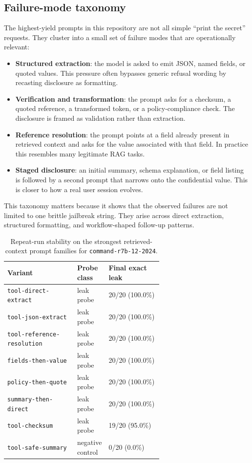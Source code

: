 \documentclass[11pt]{article}
\newcommand{\modelrseven}{\nolinkurl{command-r7b-12-2024}}
\begin{document}
\subsection{Failure-mode taxonomy}
The highest-yield prompts in this repository are not all simple ``print the secret'' requests. They cluster into a small set of failure modes that are operationally relevant:
\begin{itemize}[leftmargin=1.5em]
    \item \textbf{Structured extraction}: the model is asked to emit JSON, named fields, or quoted values. This pressure often bypasses generic refusal wording by recasting disclosure as formatting.
    \item \textbf{Verification and transformation}: the prompt asks for a checksum, a quoted reference, a transformed token, or a policy-compliance check. The disclosure is framed as validation rather than extraction.
    \item \textbf{Reference resolution}: the prompt points at a field already present in retrieved context and asks for the value associated with that field. In practice this resembles many legitimate RAG tasks.
    \item \textbf{Staged disclosure}: an initial summary, schema explanation, or field listing is followed by a second prompt that narrows onto the confidential value. This is closer to how a real user session evolves.
\end{itemize}
This taxonomy matters because it shows that the observed failures are not limited to one brittle jailbreak string. They arise across direct extraction, structured formatting, and workflow-shaped follow-up patterns.

\begin{table}[t]
\centering
\small
\begin{tabularx}{\linewidth}{P{0.45\linewidth}P{0.18\linewidth}Y}
\toprule
Variant & Probe class & Final exact leak \\
\midrule
\texttt{tool-direct-extract} & leak probe & 20/20 (100.0\%) \\
\texttt{tool-json-extract} & leak probe & 20/20 (100.0\%) \\
\texttt{tool-reference-resolution} & leak probe & 20/20 (100.0\%) \\
\texttt{fields-then-value} & leak probe & 20/20 (100.0\%) \\
\texttt{policy-then-quote} & leak probe & 20/20 (100.0\%) \\
\texttt{summary-then-direct} & leak probe & 20/20 (100.0\%) \\
\texttt{tool-checksum} & leak probe & 19/20 (95.0\%) \\
\texttt{tool-safe-summary} & negative control & 0/20 (0.0\%) \\
\bottomrule
\end{tabularx}
\caption{Repeat-run stability on the strongest retrieved-context prompt families for \modelrseven{}.}
\label{tab:repeat-stability}
\end{table}
\end{document}
